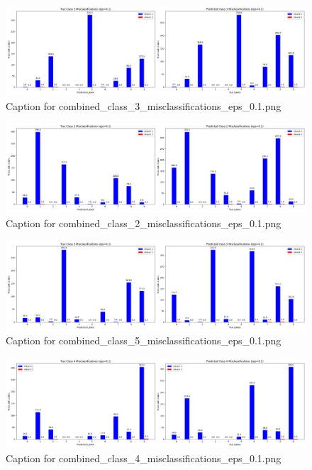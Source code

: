 \documentclass[11pt,onside]{article}
\begin{document}
\begin{figure}[ht]
\centering
\includegraphics[width=1\textwidth]{combined_class_boundary_pgd/combined_class_3_misclassifications_eps_0.1.png}
\caption{Caption for combined_class_3_misclassifications_eps_0.1.png}
\label{fig:combined_class_3_misclassifications_eps_0.1.png}
\end{figure}

\begin{figure}[ht]
\centering
\includegraphics[width=1\textwidth]{combined_class_boundary_pgd/combined_class_2_misclassifications_eps_0.1.png}
\caption{Caption for combined_class_2_misclassifications_eps_0.1.png}
\label{fig:combined_class_2_misclassifications_eps_0.1.png}
\end{figure}

\begin{figure}[ht]
\centering
\includegraphics[width=1\textwidth]{combined_class_boundary_pgd/combined_class_5_misclassifications_eps_0.1.png}
\caption{Caption for combined_class_5_misclassifications_eps_0.1.png}
\label{fig:combined_class_5_misclassifications_eps_0.1.png}
\end{figure}

\begin{figure}[ht]
\centering
\includegraphics[width=1\textwidth]{combined_class_boundary_pgd/combined_class_4_misclassifications_eps_0.1.png}
\caption{Caption for combined_class_4_misclassifications_eps_0.1.png}
\label{fig:combined_class_4_misclassifications_eps_0.1.png}
\end{figure}
\end{document}
